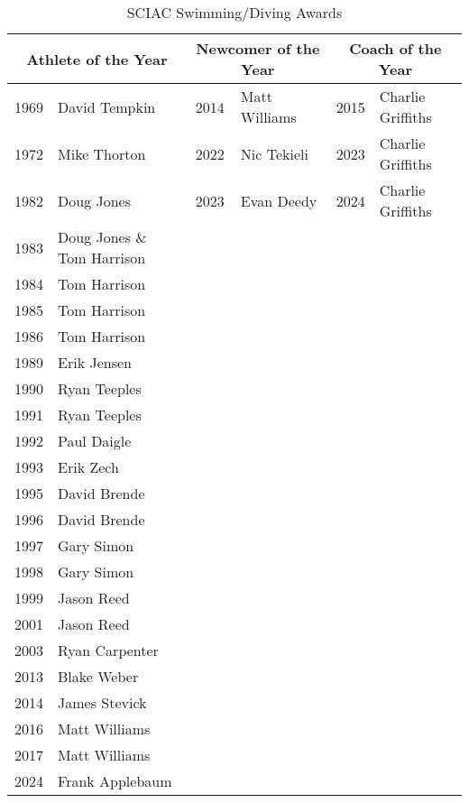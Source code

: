             
            \begin{table}[htbp]
                \centering
                \footnotesize
                \caption*{SCIAC Swimming/Diving Awards}
                \begin{tabular}{c l | c l | c l}
                \toprule
                \multicolumn{2}{c|}{\textbf{Athlete of the Year}} & \multicolumn{2}{c|}{\textbf{Newcomer of the Year}} & \multicolumn{2}{c}{\textbf{Coach of the Year}} \\
                \midrule
                1969 & David Tempkin & 2014 & Matt Williams & 2015 & Charlie Griffiths \\
                1972 & Mike Thorton & 2022 & Nic Tekieli & 2023 & Charlie Griffiths \\
                1982 & Doug Jones & 2023 & Evan Deedy & 2024 & Charlie Griffiths \\
                1983 & Doug Jones \& Tom Harrison & & & & \\
                1984 & Tom Harrison & & & & \\
                1985 & Tom Harrison & & & & \\
                1986 & Tom Harrison & & & & \\
                1989 & Erik Jensen & & & & \\
                1990 & Ryan Teeples & & & & \\
                1991 & Ryan Teeples & & & & \\
                1992 & Paul Daigle & & & & \\
                1993 & Erik Zech & & & & \\
                1995 & David Brende & & & & \\
                1996 & David Brende & & & & \\
                1997 & Gary Simon & & & & \\
                1998 & Gary Simon & & & & \\
                1999 & Jason Reed & & & & \\
                2001 & Jason Reed & & & & \\
                2003 & Ryan Carpenter & & & & \\
                2013 & Blake Weber & & & & \\
                2014 & James Stevick & & & & \\
                2016 & Matt Williams & & & & \\
                2017 & Matt Williams & & & & \\
                2024 & Frank Applebaum & & & & \\
                \bottomrule
                \end{tabular}
            \end{table}
            
